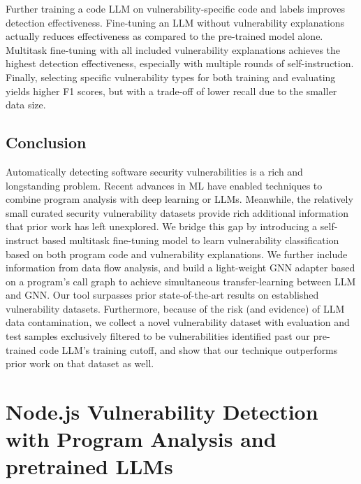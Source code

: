 \documentclass[12pt,openany,oneside,table]{cmuthesis}
\begin{document}
\begin{tcolorbox}
[colback=white,colframe=black,arc=0pt,boxrule=0.5pt,title=RQ3 Summary,boxsep=2pt,left=1pt,right=1pt,top=1pt,bottom=1pt,fonttitle=\bfseries]
Further training a code LLM on vulnerability-specific code and labels improves detection effectiveness. Fine-tuning an LLM without vulnerability explanations actually reduces effectiveness as compared to the pre-trained model alone. Multitask fine-tuning with all included vulnerability explanations achieves the highest detection effectiveness, especially with multiple rounds of self-instruction. Finally, selecting specific vulnerability types for both training and evaluating yields higher F1 scores, but with a trade-off of lower recall due to the smaller data size.
\end{tcolorbox}

\section{Conclusion}
Automatically detecting software security vulnerabilities is a rich and longstanding problem. Recent advances in ML have enabled techniques to combine program analysis with deep learning or LLMs.
Meanwhile, the relatively small curated security vulnerability datasets provide rich additional information that prior work has left unexplored. We bridge this gap by introducing a self-instruct based multitask fine-tuning model to learn vulnerability classification based on both program code and vulnerability explanations. We further include information from data flow analysis, and build a light-weight GNN adapter based on a program's call graph to achieve simultaneous transfer-learning between LLM and GNN. 
Our tool surpasses prior state-of-the-art results on established vulnerability datasets. Furthermore, because of the risk (and evidence) of LLM data contamination, we collect a novel vulnerability dataset with evaluation and test samples  exclusively filtered to be vulnerabilities identified past our pre-trained code LLM's training cutoff, and show that our technique outperforms prior work on that dataset as well. 

\chapter{Node.js Vulnerability Detection with Program Analysis and pretrained LLMs}
\label{ch:nodejs}
\end{document}
